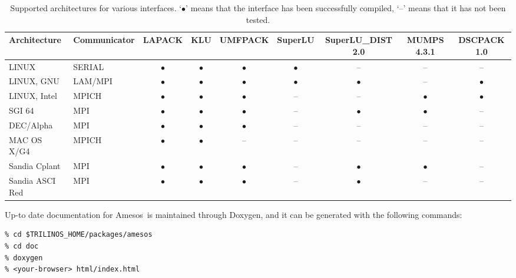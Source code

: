 \documentclass[11pt]{SANDreport}
\newcommand{\amesos}{{\sc Amesos}}
\begin{document}
\begin{sidewaystable}[tbhp]
  \centering
  \begin{tabular}{| l  l | c | c | c | c | c | c| c|}
    \hline
    Architecture & Communicator & LAPACK  & KLU       & UMFPACK   & SuperLU &  SuperLU\_DIST 2.0 & MUMPS 4.3.1 & DSCPACK 1.0\\
    \hline
    LINUX           & SERIAL  & $\bullet$ & $\bullet$ & $\bullet$ & $\bullet$ & --        & --        & --        \\
    LINUX, GNU      & LAM/MPI & $\bullet$ & $\bullet$ & $\bullet$ & $\bullet$ & $\bullet$ & --        & $\bullet$ \\
    LINUX, Intel    & MPICH   & $\bullet$ & $\bullet$ & $\bullet$ & --        & --        & $\bullet$ & $\bullet$ \\
    SGI 64          & MPI     & $\bullet$ & $\bullet$ & $\bullet$ & --        & $\bullet$ & $\bullet$ & --        \\
    DEC/Alpha       & MPI     & $\bullet$ & $\bullet$ & $\bullet$ & --        & --        & --        & --        \\
    MAC OS X/G4     & MPICH   & $\bullet$ & $\bullet$   & --      & --        & --        & --        & --        \\
    Sandia Cplant   & MPI     & $\bullet$ & $\bullet$ & $\bullet$ & --        & $\bullet$ & $\bullet$ & --        \\
    Sandia ASCI Red & MPI     & $\bullet$ & $\bullet$ & $\bullet$ & --        & $\bullet$ & --        & --        \\
    \hline
  \end{tabular}
  \caption{Supported architectures for various interfaces. 
  `$\bullet$' means that the interface has been successfully compiled, 
  `--' means that it has not been tested.}
  \label{tab:arch}
\end{sidewaystable}

\smallskip

Up-to date documentation for \amesos\ is maintained through Doxygen, and it
can be generated with the following commands:
\begin{verbatim}
% cd $TRILINOS_HOME/packages/amesos
% cd doc
% doxygen
% <your-browser> html/index.html
\end{verbatim}
\end{document}
